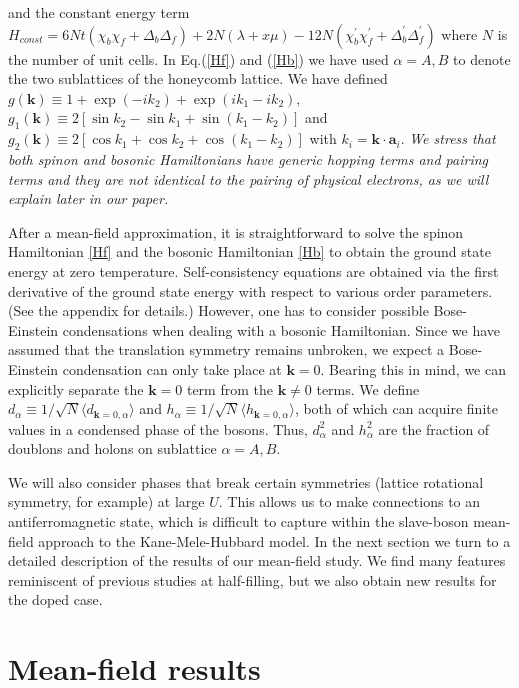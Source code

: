 \documentclass[aps,prb,twocolumn,superscriptaddress,showpacs]{revtex4-1}
\begin{document}
and the constant energy term $H_{const} = 6Nt(\chi_b\chi_f + \Delta_b\Delta_f) + 2N(\lambda+x\mu)-12N(\chi_b^{\prime}\chi_f^{\prime}+\Delta_b^{\prime}\Delta_f^{\prime})$
where $N$ is the number of unit cells. In Eq.(\ref{Hf}) and (\ref{Hb}) we have used $\alpha=A, B$ to denote the two sublattices of the honeycomb lattice. We have defined $g(\textbf{k})\equiv 1+\exp(-i k_2)+\exp(i k_1-i k_2)$, $g_1(\textbf{k}) \equiv 2[\sin k_2-\sin k_1+ \sin (k_1-k_2)]$ and $g_2({\textbf{k}}) \equiv 2\left[\cos k_1 + \cos k_2 + \cos (k_1-k_2)\right ]$ with $k_i=\textbf{k} \cdot \textbf{a}_i$.  {\em We stress that both spinon and bosonic Hamiltonians have generic hopping terms and pairing terms and they are not identical to the pairing of physical electrons, as we will explain later in our paper.}

After a mean-field approximation, it is straightforward to solve the spinon Hamiltonian \eqref{Hf} and the bosonic Hamiltonian \eqref{Hb} to obtain the ground state energy at zero temperature. Self-consistency equations are obtained via the first derivative of the ground state energy with respect to various order parameters. (See the appendix for details.) However, one has to consider possible Bose-Einstein condensations when dealing with a bosonic Hamiltonian. Since we have assumed that the translation symmetry remains unbroken, we expect a Bose-Einstein condensation can only take place at $\textbf{k}=0$. Bearing this in mind, we can explicitly separate the $\textbf{k}=0$ term from the $\textbf{k} \neq 0$ terms. We define $d_{\alpha} \equiv  1 / \sqrt{N}\langle d_{\textbf{k}=0,\alpha}  \rangle$ and $h_{\alpha} \equiv 1 / \sqrt{N}\langle h_{\textbf{k}=0,\alpha} \rangle$, both of which can acquire finite values in a condensed phase of the bosons.  Thus, $d_{\alpha}^2$ and $h_{\alpha}^2$ are the fraction of doublons and holons on sublattice $\alpha=A,B$.

We will also consider phases that break certain symmetries (lattice rotational symmetry, for example) at large $U$. This allows us to make connections to an antiferromagnetic state, which is difficult to  capture within the slave-boson mean-field approach to the Kane-Mele-Hubbard model.\cite{Vaezi:10}  In the next section we turn to a detailed description of the results of our mean-field study.  We find many features reminiscent of previous studies at half-filling, but we also obtain new results for the doped case.


\section{Mean-field results}
\label{sec:results}
\end{document}
